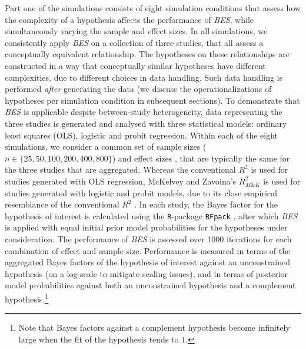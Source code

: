 \documentclass[review, 3p, authoryear]{elsarticle} %
\begin{document}
Part one of the simulations consists of eight simulation conditions that assess how the complexity of a hypothesis affects the performance of \emph{BES}, while simultaneously varying the sample and effect sizes.
In all simulations, we consistently apply \emph{BES} on a collection of three studies, that all assess a conceptually equivalent relationship.
The hypotheses on these relationships are constructed in a way that conceptually similar hypotheses have different complexities, due to different choices in data handling.
Such data handling is performed \emph{after} generating the data (we discuss the operationalizations of hypotheses per simulation condition in subsequent sections).
To demonstrate that \emph{BES} is applicable despite between-study heterogeneity, data representing the three studies is generated and analysed with three statistical models: ordinary least squares (OLS), logistic and probit regression.
Within each of the eight simulations, we consider a common set of sample sizes (\(n \in \{25, 50, 100, 200, 400, 800\}\)) and effect sizes \citep[\(R^2 \in \{0.02, 0.09, 0.25\}\), corresponding to small, medium and large effects as defined by][]{cohen_1988}, that are typically the same for the three studies that are aggregated.
Whereas the conventional \(R^2\) is used for studies generated with OLS regression, McKelvey and Zavoina's \(R^2_{M\&K}\) \citeyearpar{mckelvey_zavoina_1975} is used for studies generated with logistic and probit models, due to its close empirical resemblance of the conventional \(R^2\) \citep{hagle_mitchell_goodness_1992, demaris_explained_2002}.
In each study, the Bayes factor for the hypothesis of interest is calculated using the \texttt{R}-package \texttt{BFpack} \citep{BFpack}, after which \emph{BES} is applied with equal initial prior model probabilities for the hypotheses under consideration.
The performance of \emph{BES} is assessed over 1000 iterations for each combination of effect and sample size.
Performance is measured in terms of the aggregated Bayes factors of the hypothesis of interest against an unconstrained hypothesis (on a log-scale to mitigate scaling issues), and in terms of posterior model probabilities against both an unconstrained hypothesis and a complement hypothesis.\footnote{Note that Bayes factors against a complement hypothesis become infinitely large when the fit of the hypothesis tends to \(1\).}
\end{document}
